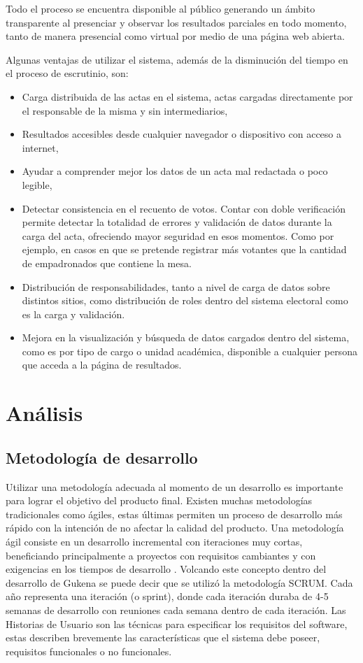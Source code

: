 Todo el proceso se encuentra disponible al público generando un ámbito transparente al presenciar y observar los resultados parciales en todo momento, tanto de manera presencial como virtual por medio de una página web abierta.

Algunas ventajas de utilizar el sistema, además de la disminución del tiempo en el proceso de escrutinio, son:
\begin{itemize}
\item Carga distribuida de las actas en el sistema, actas cargadas directamente por el responsable de la misma y sin intermediarios,
\item Resultados accesibles desde cualquier navegador o dispositivo con acceso a internet,
\item Ayudar a comprender mejor los datos de un acta mal redactada o poco legible,
\item Detectar consistencia en el recuento de votos. Contar con doble verificación permite detectar la totalidad de errores y validación de datos durante la carga del acta, ofreciendo mayor seguridad en esos momentos. Como por ejemplo, en casos en que se pretende registrar más votantes que la cantidad de empadronados que contiene la mesa.
\item Distribución de responsabilidades, tanto a nivel de carga de datos sobre distintos sitios, como distribución de roles dentro del sistema electoral como es la carga y validación.
\item Mejora en la visualización y búsqueda de datos cargados dentro del sistema, como es por tipo de cargo o unidad académica, disponible a cualquier persona que acceda a la página de resultados.
\end{itemize}

\section{Análisis}
\subsection{Metodología de desarrollo}
Utilizar una metodología adecuada al momento de un desarrollo es importante para lograr el objetivo del producto final. Existen muchas metodologías tradicionales como ágiles, estas últimas permiten un proceso de desarrollo más rápido con la intención de no afectar la calidad del producto. Una metodología ágil consiste en un desarrollo incremental con iteraciones muy cortas, beneficiando principalmente a proyectos con requisitos cambiantes y con exigencias en los tiempos de desarrollo \cite{canos2012metodologias}. Volcando este concepto dentro del desarrollo de Gukena se puede decir que se utilizó la metodología SCRUM. Cada año representa una iteración (o sprint), donde cada iteración duraba de 4-5 semanas de desarrollo con reuniones cada semana dentro de cada iteración. Las Historias de Usuario son las técnicas para especificar los requisitos del software, estas describen brevemente las características que el sistema debe poseer, requisitos funcionales o no funcionales.
